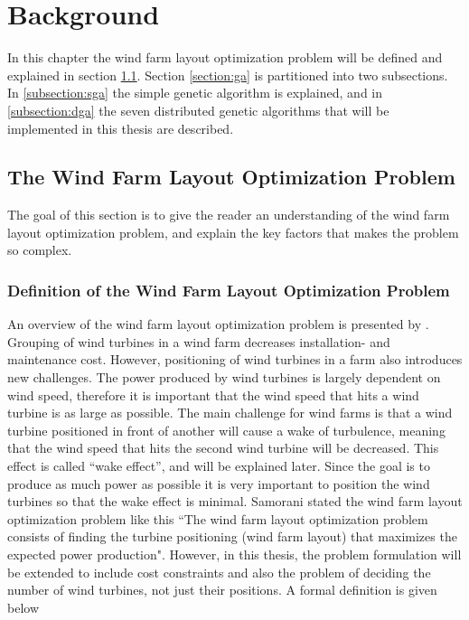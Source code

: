 \chapter{Background}\label{chapter:background}
In this chapter the wind farm layout optimization problem will be defined and explained in section \ref{section:wflop}. Section \ref{section:ga} is partitioned into two subsections. In \ref{subsection:sga} the simple genetic algorithm is explained, and in \ref{subsection:dga} the seven distributed genetic algorithms that will be implemented in this thesis are described. 


\section{The Wind Farm Layout Optimization Problem}\label{section:wflop}
The goal of this section is to give the reader an understanding of the wind farm layout optimization problem, and explain the key factors that makes the problem so complex.


\subsection{Definition of the Wind Farm Layout Optimization Problem}
An overview of the wind farm layout optimization problem is presented by \cite{Samorani}. Grouping of wind turbines in a wind farm decreases installation- and maintenance cost. However, positioning of wind turbines in a farm also introduces new challenges. The power produced by wind turbines is largely dependent on wind speed, therefore it is important that the wind speed that hits a wind turbine is as large as possible. The main challenge for wind farms is that a wind turbine positioned in front of another will cause a wake of turbulence, meaning that the wind speed that hits the second wind turbine will be decreased. This effect is called ``wake effect'', and will be explained later. Since the goal is to produce as much power as possible it is very important to position the wind turbines so that the wake effect is minimal. Samorani stated the wind farm layout optimization problem like this ``The wind farm layout optimization problem consists of finding the turbine positioning (wind farm layout) that maximizes the expected power production". However, in this thesis, the problem formulation will be extended to include cost constraints and also the problem of deciding the number of wind turbines, not just their positions. A formal definition is given below



